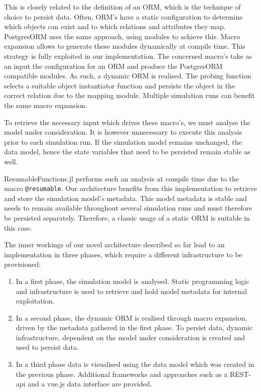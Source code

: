 \documentclass{juliacon}
\begin{document}
This is closely related to the definition of an ORM, which is the technique of choice to persist data. Often, ORM's have a static configuration to determine which objects can exist and to which relations and attributes they map. PostgresORM \cite{tecnivelPostgresORM} uses the same approach, using modules to achieve this. Macro expansion allows to generate these modules dynamically at compile time. This strategy is fully exploited in our implementation. The concerned macro's take as an input the configuration for an ORM and produce the PostgresORM compatible modules. As such, a dynamic ORM is realised. The probing function selects a suitable object instantiator function and persists the object in the correct relation due to the mapping module. Multiple simulation runs can benefit the same macro expansion.\vskip 6pt

To retrieve the necessary input which drives these macro's, we must analyse the model under consideration. It is however unnecessary to execute this analysis prior to each simulation run. If the simulation model remains unchanged, the data model, hence the state variables that need to be persisted remain stable as well.\vskip 6pt

ResumableFunctions.jl performs such an analysis at compile time due to the macro \texttt{@resumable}. Our architecture benefits from this implementation to retrieve and store the simulation model's metadata. This model metadata is stable and needs to remain available throughout several simulation runs and must therefore be persisted separately. Therefore, a classic usage of a static ORM is suitable in this case.\vskip 6pt

The inner workings of our novel architecture described so far lead to an implementation in three phases, which require a different infrastructure to be provisioned:

\begin{enumerate}
	\item In a first phase, the simulation model is analysed. Static programming logic and infrastructure is used to retrieve and hold model metadata for internal exploitation.
	\item In a second phase, the dynamic ORM is realised through macro expansion, driven by the metadata gathered in the first phase. To persist data, dynamic infrastructure, dependent on the model under consideration is created and used to persist data.
	\item In a third phase data is visualised using the data model which was created in the previous phase. Additional frameworks and approaches such as a REST-api and a vue.js data interface are provided.
\end{enumerate}
\end{document}
